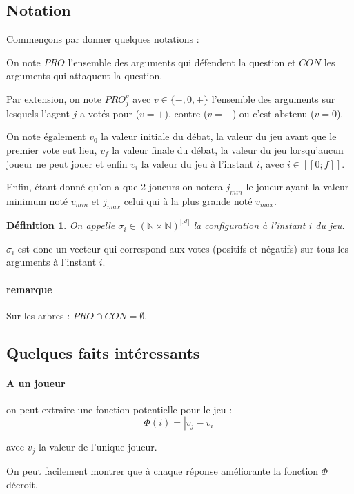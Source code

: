\documentclass[12pt]{article}
\theoremstyle{defi}
\newtheorem{definition}{Définition}[section]
\theoremstyle{not}
\theoremstyle{prob}
\begin{document}
    \subsection{Notation}
      Commençons par donner quelques notations :

      On note $PRO$ l'ensemble des arguments qui défendent la question et $CON$ les arguments qui attaquent la question.

      Par extension, on note $PRO^v_j$ avec $v \in \{-, 0, +\}$ l'ensemble des arguments sur lesquels l'agent $j$ a votés pour ($v = +$), contre ($v = -$) ou c'est abstenu ($v = 0$).

      On note également $v_0$ la valeur initiale du débat, la valeur du jeu avant que le premier vote eut lieu, $v_f$ la valeur finale du débat, la valeur du jeu lorsqu'aucun joueur ne peut jouer et enfin $v_i$ la valeur du jeu à l'instant $i$, avec $i \in [\![ 0;f ]\!]$.

      Enfin, étant donné qu'on a que 2 joueurs on notera $j_{min}$ le joueur ayant la valeur minimum noté $v_{min}$ et $j_{max}$ celui qui à la plus grande noté $v_{max}$.

      \begin{definition}
        On appelle $\sigma_i \in (\mathbb{N} \times \mathbb{N})^{|\mathcal{A}|}$ la configuration à l'instant $i$ du jeu.
      \end{definition}

      $\sigma_i$ est donc un vecteur qui correspond aux votes (positifs et négatifs) sur tous les arguments à l'instant $i$.

      \paragraph{remarque} Sur les arbres : $PRO \cap CON = \emptyset$.

    \subsection{Quelques faits intéressants}
      \paragraph{A un joueur} on peut extraire une fonction potentielle pour le jeu :
        $$ \Phi(i) = |v_j - v_i| $$

        avec $v_j$ la valeur de l'unique joueur.

        On peut facilement montrer que à chaque réponse améliorante la fonction $\Phi$ décroit.
\end{document}
